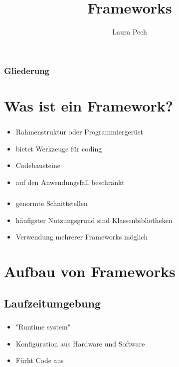 \documentclass[aspectratio=169,14pt,xcolor=dvipsnames]{beamer}
\title{Frameworks}
\author[]{Laura Pech}
\institute{Unitedprint.com SE\\Auszubildende Fachinformatikerin für Anwendungsentwicklung}
\date{\datum}
\begin{document}
\maketitle

\begin{frame}[t]
    \frametitle{Gliederung}
    \hypersetup{linkcolor=black}
    \tableofcontents%
\end{frame}

\section{Was ist ein Framework?}
\begin{frame}[t]
    \frametitle{\secname}
    \begin{itemize}
        \setlength{\itemsep}{1.5em}
        \item Rahmenstruktur oder Programmiergerüst
        \item bietet Werkzeuge für coding
        \item Codebausteine
        \item auf den Anwendungsfall beschränkt
    \end{itemize}

\end{frame}

\begin{frame}[t]
    \frametitle{\secname}
    \begin{itemize}
        \setlength{\itemsep}{1.5em}
        \item genormte Schnittstellen
        \item häufigster Nutzungsgrund sind Klassenbibliotheken
        \item Verwendung mehrerer Frameworks möglich
    \end{itemize}
\end{frame}

\section{Aufbau von Frameworks}
\subsection{Laufzeitumgebung}
\begin{frame}[t]
    \frametitle{\subsecname}
    \framesubtitle{\secname}
    \begin{itemize}
        \setlength{\itemsep}{1.5em}
        \item "Runtime system"
        \item Konfiguration aus Hardware und Software
        \item Fürht Code aus
    \end{itemize}
\end{frame}
\end{document}
